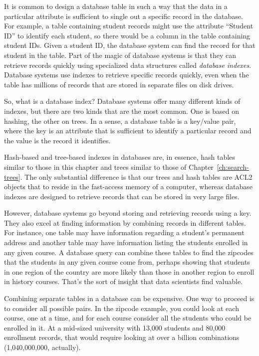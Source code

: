 It is common to design a database table in such a way that the
data in a particular attribute is sufficient
to single out a specific record in the database.
For example, a table containing student records might use the attribute
``Student ID'' to identify each student, so there would be
a column in the table containing student IDs.
Given a student ID, the
database system can find the record for that student in the
table. Part of the magic of database systems is that they can retrieve
records quickly using specialized data
structures called \emph{database indexes}.
Database systems use indexes to retrieve specific records quickly,
even when the table has millions of records that are stored
in separate files on disk drives.

So, what is a database index? Database systems
offer many different kinds of indexes, but there are two kinds that are
the most common. One is based on hashing, the other on trees.
In a sense, a database
table is a key/value pair, where the key is an attribute that is
sufficient to identify a particular record and the value is the record
it identifies.

Hash-based and tree-based indexes
in databases are,
in essence, hash tables similar to those in this chapter
and trees similar to those of Chapter~\ref{ch:search-trees}.
The only substantial difference
is that our trees and hash tables are ACL2 objects that
to reside in the fast-access memory of a computer,
whereas database indexes are designed to retrieve records
that can be stored in very large files.

However, database systems go beyond storing and retrieving records
using a key. They also excel at finding information by combining
records in different tables. For instance, one table may have
information regarding a student's permanent address and another table
may have information listing the students enrolled in any given course.
A database query can combine these tables to find the zipcodes that
the students in any given course come from, perhaps showing that students in one
region of the country are more likely than those in another region to
enroll in history courses. That's the sort of insight that
data scientists find valuable.

Combining separate tables in a database can be expensive.
One way to proceed is to consider all possible pairs.
In the zipcode example, you could look at each course,
one at a time, and for each course consider
all the students who could be enrolled in it.
At a mid-sized university with 13,000 students
and 80,000 enrollment records, that would require
looking at over a billion combinations (1,040,000,000, actually).

